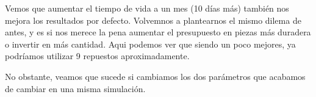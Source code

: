 \documentclass[11pt,a4paper]{report}
\begin{document}
\begin{table}[H]
\centering
{}
\end{table}

Vemos que aumentar el tiempo de vida a un mes (10 días más) también nos mejora los resultados por defecto. Volvemnos a plantearnos el mismo
dilema de antes, y es si nos merece la pena aumentar el presupuesto en piezas más duradera o invertir en más cantidad. Aqui podemos ver que
siendo un poco mejores, ya podríamos utilizar 9 repuestos aproximadamente.

No obstante, veamos que sucede si cambiamos los dos parámetros que acabamos de cambiar en una misma simulación.
\end{document}
